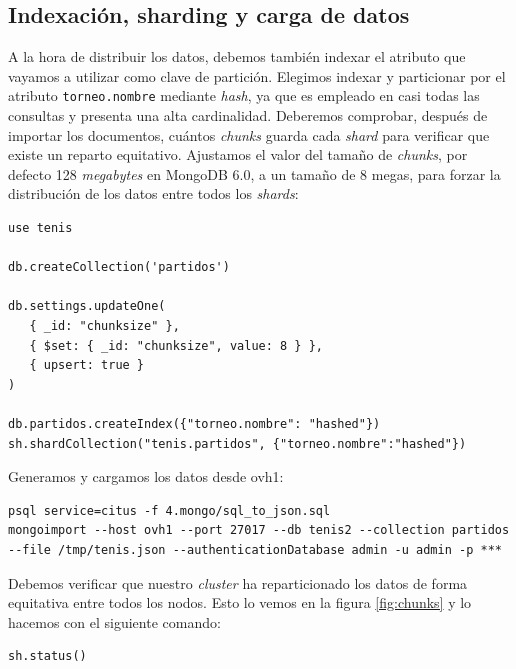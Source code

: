 \subsection{Indexación, sharding y carga de datos}

A la hora de distribuir los datos, debemos también indexar el atributo que vayamos a utilizar como clave de partición. Elegimos indexar y particionar por el atributo \texttt{torneo.nombre} mediante \textit{hash}, ya que es empleado en casi todas las consultas y presenta una alta cardinalidad. Deberemos comprobar, después de importar los documentos, cuántos \textit{chunks} guarda cada \textit{shard} para verificar que existe un reparto equitativo. Ajustamos el valor del tamaño de \textit{chunks}, por defecto 128 \textit{megabytes} en MongoDB 6.0, a un tamaño de 8 megas, para forzar la distribución de los datos entre todos los \textit{shards}:

\newpage

\begin{verbatim}
use tenis

db.createCollection('partidos')

db.settings.updateOne(
   { _id: "chunksize" },
   { $set: { _id: "chunksize", value: 8 } },
   { upsert: true }
)

db.partidos.createIndex({"torneo.nombre": "hashed"})
sh.shardCollection("tenis.partidos", {"torneo.nombre":"hashed"})
\end{verbatim}

\noindent Generamos y cargamos los datos desde ovh1:

\begin{verbatim}
psql service=citus -f 4.mongo/sql_to_json.sql
mongoimport --host ovh1 --port 27017 --db tenis2 --collection partidos --file /tmp/tenis.json --authenticationDatabase admin -u admin -p ***
\end{verbatim}

\noindent Debemos verificar que nuestro \textit{cluster} ha reparticionado los datos de forma equitativa entre todos los nodos. Esto lo vemos en la figura \ref{fig:chunks} y lo hacemos con el siguiente comando:

\begin{verbatim}
sh.status()
\end{verbatim}

